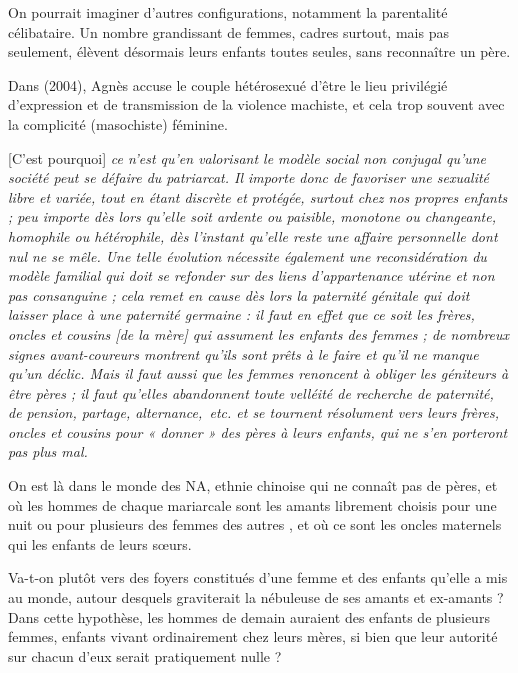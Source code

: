 On pourrait imaginer d'autres configurations, notamment la parentalité célibataire. Un nombre grandissant de femmes, cadres surtout, mais pas seulement, élèvent désormais leurs enfants toutes seules, sans reconnaître un père. 

Dans  (2004), Agnès  accuse le couple hétérosexué d'être le lieu privilégié d'expression et de transmission de la violence machiste, et cela trop souvent avec la complicité (masochiste) féminine. %

\begin{displayquote}
{[C'est pourquoi] \emph{ce n'est qu'en valorisant le modèle social non conjugal qu'une société peut se défaire du patriarcat. Il importe donc de favoriser une sexualité libre et variée, tout en étant discrète et protégée, surtout chez nos propres enfants ; peu importe dès lors qu'elle soit ardente ou paisible, monotone ou changeante, homophile ou hétérophile, dès l'instant qu'elle reste une affaire personnelle dont nul ne se mêle. Une telle évolution nécessite également une reconsidération du modèle familial qui doit se refonder sur des liens d'appartenance utérine et non pas consanguine ; cela remet en cause dès lors la paternité génitale qui doit laisser place à une paternité germaine : il faut en effet que ce soit les frères, oncles et cousins \emph{[de la mère]} qui assument les enfants des femmes ; de nombreux signes avant-coureurs montrent qu'ils sont prêts à le faire et qu'il ne manque qu'un déclic. Mais il faut aussi que les femmes renoncent à obliger les géniteurs à être pères ; il faut qu'elles abandonnent toute velléité de recherche de paternité, de pension, partage, alternance,~etc. et se tournent résolument vers leurs frères, oncles et cousins pour « donner » des pères à leurs enfants, qui ne s'en porteront pas plus mal.}}
\end{displayquote}

 On est là dans le monde des NA, ethnie chinoise qui ne connaît pas de pères, et où les hommes de chaque  mariarcale sont les amants librement choisis pour une nuit ou pour plusieurs des femmes des autres , et où ce sont les oncles maternels qui  les enfants de leurs sœurs. 
 
 
 Va-t-on plutôt vers des foyers constitués d'une femme et des enfants qu'elle a mis au monde, autour desquels graviterait la nébuleuse de ses amants et ex-amants ? Dans cette hypothèse, les hommes de demain auraient des enfants de plusieurs femmes, enfants vivant ordinairement chez leurs mères, si bien que leur autorité sur chacun d'eux serait pratiquement nulle ? 
 
